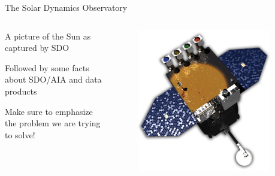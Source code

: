 \documentclass[final,12pt]{beamer}
\newlength{\sepwidth}
\newlength{\colwidth}
\newcommand{\separatorcolumn}{\begin{column}{\sepwidth}\end{column}}
\begin{document}
\begin{frame}[fragile,t]
\begin{columns}[t]
\separatorcolumn

\begin{column}{\colwidth}

  \begin{block}{The Solar Dynamics Observatory}
    \begin{columns}
      \begin{column}{0.6667\columnwidth}
        A picture of the Sun as captured by SDO

        Followed by some facts about SDO/AIA and data products

        Make sure to emphasize the problem we are trying to solve!
      \end{column}
      \begin{column}{0.333\columnwidth}
        \begin{figure}
          \centering
          \includegraphics[width=\columnwidth]{figures/sdo.png}
        \end{figure}
      \end{column}
    \end{columns}

  \end{block}


\end{column}
\end{columns}
\end{frame}
\end{document}
